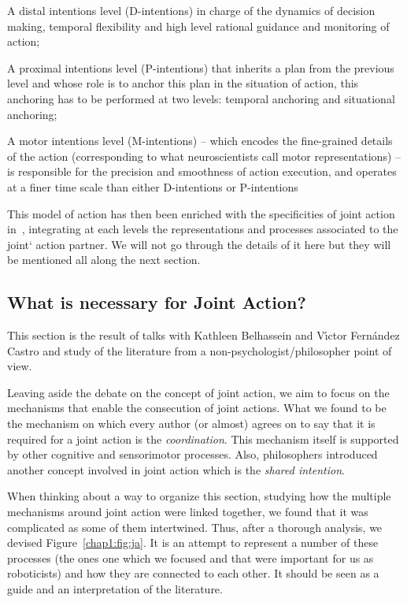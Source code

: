 \documentclass[a4paper,11pt,twoside]{StyleThese}
\begin{document}
\begin{bulletList}
	\item A distal intentions level (D-intentions) in charge of the dynamics of decision making, temporal flexibility and high level rational guidance and monitoring of action;
	\item A proximal intentions level (P-intentions) that inherits a plan from the previous level and whose role is to anchor this plan in the situation of action, this anchoring has to be performed at two levels: temporal anchoring and situational anchoring;
	\item A motor intentions level (M-intentions) -- which encodes the fine-grained details of the action (corresponding to what neuroscientists call motor representations) -- is responsible for the precision and smoothness of action execution, and operates at a finer time scale than either D-intentions or P-intentions
\end{bulletList}

This model of action has then been enriched with the specificities of joint action in~\cite{pacherie_2012_agency}, integrating at each levels the representations and processes associated to the joint` action partner. We will not go through the details of it here but they will be mentioned all along the next section.

\subsection{What is necessary for Joint Action?}\label{chap1:subsec:necess_ja}

This section is the result of talks with Kathleen Belhassein and V{\'\i}ctor Fern{\'a}ndez Castro and study of the literature from a non-psychologist/philosopher point of view.

Leaving aside the debate on the concept of joint action, we aim to focus on the mechanisms that enable the consecution of joint actions. What we found to be the mechanism on which every author (or almost) agrees on to say that it is required for a joint action is the \emph{coordination}. This mechanism itself is supported by other cognitive and sensorimotor processes. Also, philosophers introduced another concept involved in joint action which is the \emph{shared intention}. 

When thinking about a way to organize this section, studying how the multiple mechanisms around joint action were linked together, we found that it was complicated as some of them intertwined. Thus, after a thorough analysis, we devised Figure~\ref{chap1:fig:ja}. It is an attempt to represent a number of these processes (the ones one which we focused and that were important for us as roboticists) and how they are connected to each other. It should be seen as a guide and an interpretation of the literature.
\end{document}
